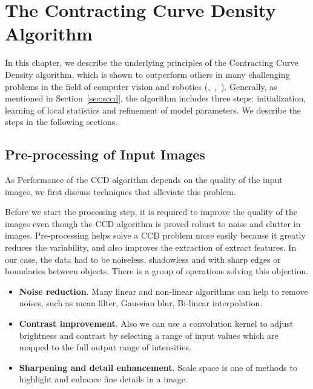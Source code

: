 \chapter{The Contracting Curve Density Algorithm}
\label{chapter:ccd}
In this chapter, we describe the underlying principles of the
Contracting Curve Density algorithm, which is shown to
outperform others in many challenging problems in the field of computer
vision and robotics (\cite{panin2006fully},~\cite{hanek2004contracting},~\cite{hahn2007tracking}). Generally, as mentioned in Section~\ref{sec:sccd},
the algorithm includes three steps: initialization, learning of
local statistics and refinement of model parameters. We describe the
steps in the following sections. 
\section{Pre-processing of Input Images}
\label{sec:init}
As Performance of the CCD algorithm depends on the quality of the
input images, we first discuss techniques that alleviate this problem.

Before we start the processing step, it is required to
improve the quality of the images even though the CCD
algorithm is proved robust to noise and clutter in
images. Pre-processing helps solve a CCD problem more easily
because it greatly reduces the variability, and also improves the
extraction of extract features. %
In our case, the data had to be noiseless, shadowless and with sharp edges or boundaries
between objects. There is a group of operations solving this objection.
\begin{itemize}
\item \textbf{Noise reduction}. Many linear and non-linear algorithms
  can help to remove noises, such as mean filter, Gaussian blur,
  Bi-linear interpolation.
\item \textbf{Contrast improvement}. Also we can use a convolution kernel to
  adjust brightness and contrast by selecting a range of input values
  which are mapped to the full output range of intensities.
\item \textbf{Sharpening and detail enhancement}. Scale space is one
  of methods to highlight and enhance fine details in a image.
\end{itemize}

